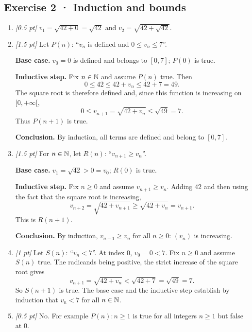 \subsection*{Exercise 2 · Induction and bounds}\begin{enumerate}

\item \textit{[0.5 pt]} $v_1=\sqrt{42+0}=\sqrt{42}$ and $v_2=\sqrt{42+\sqrt{42}}$.

\item \textit{[1.5 pt]} Let $P(n)$: ``$v_n$ is defined and $0\le v_n\le 7$''.
\par\smallskip\textbf{Base case.} $v_0=0$ is defined and belongs to $[0,7]$; $P(0)$ is true.
\par\smallskip\textbf{Inductive step.} Fix $n\in\mathbb N$ and assume $P(n)$ true. Then
\[0\le 42\le 42+v_n\le 42+7=49.\]
The square root is therefore defined and, since this function is increasing on $[0,+\infty[$,
\[0\le v_{n+1}=\sqrt{42+v_n}\le\sqrt{49}=7.\]
Thus $P(n+1)$ is true.
\par\smallskip\textbf{Conclusion.} By induction, all terms are defined and belong to $[0,7]$.

\item \textit{[1.5 pt]} For $n\in\mathbb N$, let $R(n)$: ``$v_{n+1}\ge v_n$''.
\par\smallskip\textbf{Base case.} $v_1=\sqrt{42}>0=v_0$; $R(0)$ is true.
\par\smallskip\textbf{Inductive step.} Fix $n\ge0$ and assume $v_{n+1}\ge v_n$. Adding $42$ and then using the fact that the square root is increasing,
\[v_{n+2}=\sqrt{42+v_{n+1}}\ge\sqrt{42+v_n}=v_{n+1}.\]
This is $R(n+1)$.
\par\smallskip\textbf{Conclusion.} By induction, $v_{n+1}\ge v_n$ for all $n\ge0$: $(v_n)$ is increasing.

\item \textit{[1 pt]} Let $S(n)$: ``$v_n<7$''. At index $0$, $v_0=0<7$.
Fix $n\ge0$ and assume $S(n)$ true. The radicands being positive, the strict increase of the square root gives
\[v_{n+1}=\sqrt{42+v_n}<\sqrt{42+7}=\sqrt{49}=7.\]
So $S(n+1)$ is true. The base case and the inductive step establish by induction that $v_n<7$ for all $n\in\mathbb N$.

\item \textit{[0.5 pt]} No. For example $P(n):n\ge1$ is true for all integers $n\ge1$ but false at $0$.

\end{enumerate}

